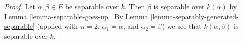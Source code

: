 \documentclass[10pt,a4paper]{amsart}
\theoremstyle{plain}
\theoremstyle{definition}
\theoremstyle{remark}
\numberwithin{equation}{subsection}
\begin{document}
\begin{proof}
Let $\alpha, \beta \in E$ be separable over $k$. Then $\beta$ is separable
over $k(\alpha)$ by Lemma \ref{lemma-separable-goes-up}.
By Lemma \ref{lemma-separably-generated-separable} (applied with $n = 2$,
$\alpha_1 = \alpha$, and $\alpha_2 = \beta$) we see that
$k(\alpha, \beta)$ is separable over $k$.
\end{proof}
\end{document}
